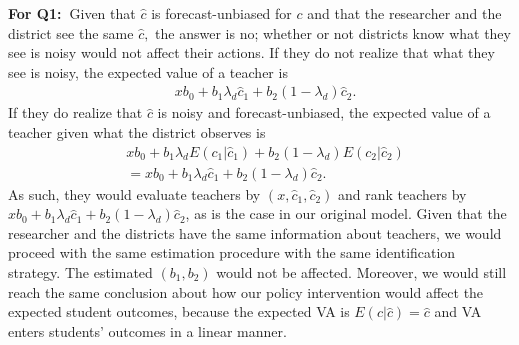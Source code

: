 \documentclass[notitlepage,12pt]{article}%
\begin{document}
\textbf{For Q1:\ }Given that $\widehat{c}$ is forecast-unbiased  for $c$ and
that the researcher and the district see the same $\widehat{c},$ the answer is
no; whether or not districts know what they see is noisy would not affect their actions. If they do not realize that what they see is noisy, the expected value of a teacher is%
\begin{align}
&  xb_{0}+b_{1}\lambda_{d}\widehat{c}_{1}+b_{2}\left(  1-\lambda_{d}\right)
\widehat{c}_{2}.\nonumber
\end{align}
\noindent If they do realize that
$\widehat{c}$ is noisy and forecast-unbiased, the expected value of a teacher given what the
district observes is%
\begin{align}
&  xb_{0}+b_{1}\lambda_{d}E\left(  c_{1}|\widehat{c}_{1}\right)  +b_{2}\left(
1-\lambda_{d}\right)  E\left(  c_{2}|\widehat{c}_{2}\right) \label{EB}\\
&  =xb_{0}+b_{1}\lambda_{d}\widehat{c}_{1}+b_{2}\left(  1-\lambda_{d}\right)
\widehat{c}_{2}.\nonumber
\end{align}
As such, they would evaluate teachers by $\left(  x,\widehat{c}_{1}%
,\widehat{c}_{2}\right)  $ and rank teachers by\ $xb_{0}+b_{1}\lambda
_{d}\widehat{c}_{1}+b_{2}\left(  1-\lambda_{d}\right)  \widehat{c}_{2}$, as is
the case in our original model. Given that the researcher and the districts
have the same information about teachers, we would proceed with the same
estimation procedure with the same identification strategy. The estimated
$\left(  b_{1},b_{2}\right)  $ would not be affected. Moreover, we would still
reach the same conclusion about how our policy intervention would affect the
expected student outcomes, because the expected VA is $E\left(  c|\widehat{c}%
\right)  =\widehat{c}$ and VA enters students' outcomes in a linear
manner.\newline
\end{document}

